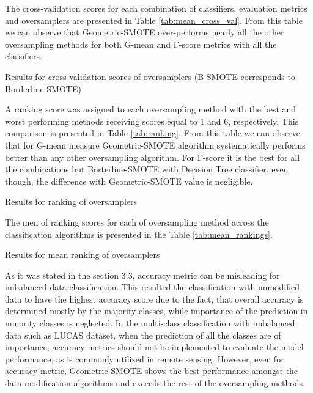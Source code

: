 \documentclass[parskip=full]{scrartcl}
\begin{document}
The cross-validation scores for each combination of classifiers, evaluation
metrics and oversamplers are presented in Table \ref{tab:mean_cross_val}.
From this table we can observe that Geometric-SMOTE over-performs nearly all
the other oversampling methods for both G-mean and F-score metrics with all the
classifiers.

\begin{table}[H]
	\centering
	\caption{\label{tab:mean_cross_val}Results for cross validation scores
		of oversamplers (B-SMOTE corresponds to Borderline SMOTE)}
\end{table}

A ranking score was assigned to each oversampling method with the best and
worst performing methods receiving scores equal to 1 and 6, respectively. This
comparison is presented in Table \ref{tab:ranking}. From this table we can
observe that for G-mean measure Geometric-SMOTE algorithm systematically
performs better than any other oversampling algorithm. For F-score it is the
best for all the combinations but Borterline-SMOTE with Decision Tree
classifier, even though, the difference with Geometric-SMOTE value is
negligible.

\begin{table}[H]
	\centering
	\caption{\label{tab:ranking} Results for ranking of oversamplers}
\end{table}

The men of ranking scores for each of oversampling method across the
classification algorithms is presented in the Table \ref{tab:mean_rankings}.

\begin{table}[H]
	\centering
	\caption{\label{tab:mean_rankings} Results for mean ranking of oversamplers}
\end{table}

As it was stated in the section 3.3, accuracy metric can be misleading for
imbalanced data classification. This resulted the classification with
unmodified data to have the highest accuracy score due to the fact, that
overall accuracy is determined mostly by the majority classes, while importance
of the prediction in minority classes is neglected. In the multi-class
classification with imbalanced data such as LUCAS dataset, when the
prediction of all the classes are of importance, accuracy metrics should not be
implemented to evaluate the model performance, as is commonly utilized in
remote sensing. However, even for accuracy metric, Geometric-SMOTE shows the
best performance amongst the data modification algorithms and exceeds the rest
of the oversampling methods.
\end{document}
